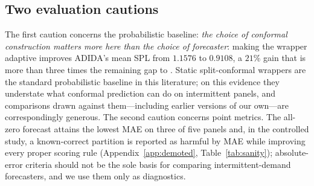 \subsection{Two evaluation cautions}\label{sec:cautions}

The first caution concerns the probabilistic baseline: \emph{the choice of conformal construction matters more here than
the choice of forecaster}: making the wrapper adaptive
\citep{gibbs2021} improves ADIDA's mean SPL from $1.1576$ to $0.9108$, a
$21\%$ gain that is more than three times the remaining gap to \EBB{}.
Static split-conformal wrappers are the standard probabilistic baseline in
this literature; on this evidence they understate what conformal
prediction can do on intermittent panels, and comparisons drawn against
them---including earlier versions of our own---are correspondingly
generous.
The second caution concerns point metrics. The all-zero forecast attains
the lowest MAE on three of five panels and, in the controlled study, a
known-correct partition is reported as harmful by MAE while improving
every proper scoring rule (Appendix~\ref{app:demoted},
Table~\ref{tab:sanity}); absolute-error criteria should not be the sole
basis for comparing intermittent-demand forecasters, and we use them
only as diagnostics.

